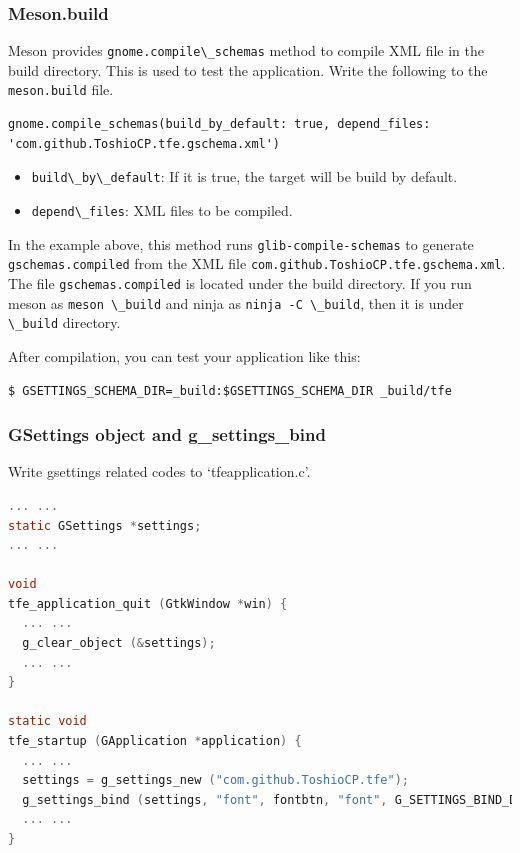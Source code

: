 \hypertarget{meson.build}{%
\subsubsection{Meson.build}\label{meson.build}}

Meson provides \passthrough{\lstinline!gnome.compile\_schemas!} method
to compile XML file in the build directory. This is used to test the
application. Write the following to the
\passthrough{\lstinline!meson.build!} file.

\begin{lstlisting}
gnome.compile_schemas(build_by_default: true, depend_files: 'com.github.ToshioCP.tfe.gschema.xml')
\end{lstlisting}

\begin{itemize}
\tightlist
\item
  \passthrough{\lstinline!build\_by\_default!}: If it is true, the
  target will be build by default.
\item
  \passthrough{\lstinline!depend\_files!}: XML files to be compiled.
\end{itemize}

In the example above, this method runs
\passthrough{\lstinline!glib-compile-schemas!} to generate
\passthrough{\lstinline!gschemas.compiled!} from the XML file
\passthrough{\lstinline!com.github.ToshioCP.tfe.gschema.xml!}. The file
\passthrough{\lstinline!gschemas.compiled!} is located under the build
directory. If you run meson as \passthrough{\lstinline!meson \_build!}
and ninja as \passthrough{\lstinline!ninja -C \_build!}, then it is
under \passthrough{\lstinline!\_build!} directory.

After compilation, you can test your application like this:

\begin{lstlisting}
$ GSETTINGS_SCHEMA_DIR=_build:$GSETTINGS_SCHEMA_DIR _build/tfe
\end{lstlisting}

\hypertarget{gsettings-object-and-g_settings_bind}{%
\subsubsection{GSettings object and
g\_settings\_bind}\label{gsettings-object-and-g_settings_bind}}

Write gsettings related codes to `tfeapplication.c'.

\begin{lstlisting}[language=C]
... ...
static GSettings *settings;
... ...

void
tfe_application_quit (GtkWindow *win) {
  ... ...
  g_clear_object (&settings);
  ... ...
}

static void
tfe_startup (GApplication *application) {
  ... ...
  settings = g_settings_new ("com.github.ToshioCP.tfe");
  g_settings_bind (settings, "font", fontbtn, "font", G_SETTINGS_BIND_DEFAULT);
  ... ...
}
\end{lstlisting}

